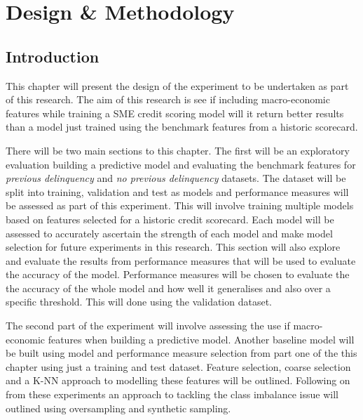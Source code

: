 
\chapter{Design \& Methodology} %

\label{Chapter4} %


\section{Introduction}

This chapter will present the design of the experiment to be undertaken as part of this research. The aim of this research is see if including macro-economic features while training a SME credit scoring model will it return better results than a model just trained using the benchmark features from a historic scorecard. 

There will be two main sections to this chapter. The first will be an exploratory evaluation building a predictive model and evaluating the benchmark features for \textit{previous delinquency} and \textit{no previous delinquency} datasets. The dataset will be split into training, validation and test as models and performance measures will be assessed as part of this experiment. This will involve training multiple models based on features selected for a historic credit scorecard. Each model will be assessed to accurately ascertain the strength of each model and make model selection for future experiments in this research. This section will also explore and evaluate the results from performance measures that will be used  to evaluate the accuracy of the model. Performance measures will be chosen to evaluate the the accuracy of the whole model and how well it generalises and also over a specific threshold. This will done using the validation dataset. 

The second part of the experiment will involve assessing the use if macro-economic features when building a predictive model. Another baseline model will be built using model and performance measure selection from part one of the this chapter using just a training and test dataset. Feature selection, coarse selection and a K-NN approach to modelling these features will be outlined. Following on from these experiments an approach to tackling the class imbalance issue will outlined using oversampling and synthetic sampling.


